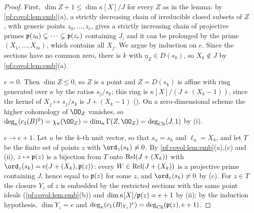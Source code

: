 \begin{proof}
First, $\dim Z+1\le\dim\kappa[X]/J$ for every $Z$ as in the lemma: by \cref{pf:covol:lem:emb}(a), a
strictly decreasing chain of irreducible closed subsets of $Z$, with generic points $z_0,\dots,z_r$, gives a
strictly increasing chain of projective primes $\mathfrak{p}(z_0)\subsetneq\dots\subsetneq\mathfrak{p}(z_r)$
containing $J$, and it can be prolonged by the prime $(X_1,\dots,X_m)$, which contains all $X_j$. We
argue by induction on $e$. Since the sections have no common zero, there is $k$ with $\eta_Z\in D(s_k)$,
so $X_k\notin J$ by \cref{pf:covol:lem:emb}(a).

\emph{$e=0$.} Then $\dim Z\le0$, so $Z$ is a point and $Z=D(s_k)$ is affine with ring generated over
$\kappa$ by the ratios $s_j/s_k$; this ring is $\kappa[X]/(J+(X_k-1))$, since the kernel of
$X_j\mapsto s_j/s_k$ is $J+(X_k-1)$ (). On
a zero-dimensional scheme the higher cohomology of $\OO_Z$ vanishes, so
$\deg_\kappa(c_1(B)^0)=\chi_\kappa(\OO_Z)=\dim_\kappa\Gamma(Z,\OO_Z)=\covolCdeg(J,1)$ by (i).

\emph{$e\to e+1$.} Let $u$ be the $k$-th unit vector, so that $s_u=s_k$ and $\ell_u=X_k$, and let $T$ be
the finite set of points $z$ with $\ord_z(s_k)\ne0$. By \cref{pf:covol:lem:emb}(a),(c) and (ii),
$z\mapsto\mathfrak{p}(z)$ is a bijection from $T$ onto $\operatorname{Rel}(J+(X_k))$ with
$\ord_z(s_k)=\covolLm(J+(X_k),\covolPt(z))$: every $W\in\operatorname{Rel}(J+(X_k))$ is a projective prime
containing $J$, hence equal to $\mathfrak{p}(z)$ for some $z$, and $\ord_z(s_k)\ne0$ by (c). For $z\in T$ the
closure $Y_z$ of $z$ is embedded by the restricted sections with the same point ideals
(\cref{pf:covol:lem:emb}(b)) and $\dim\kappa[X]/\mathfrak{p}(z)=e+1$ by (ii); by the induction hypothesis,
$\dim Y_z=e$ and $\deg_\kappa(c_1(B|_{Y_z})^e)=\operatorname{deg}_{\mathrm{Ch}}(\mathfrak{p}(z),e+1)$.


\end{proof}
